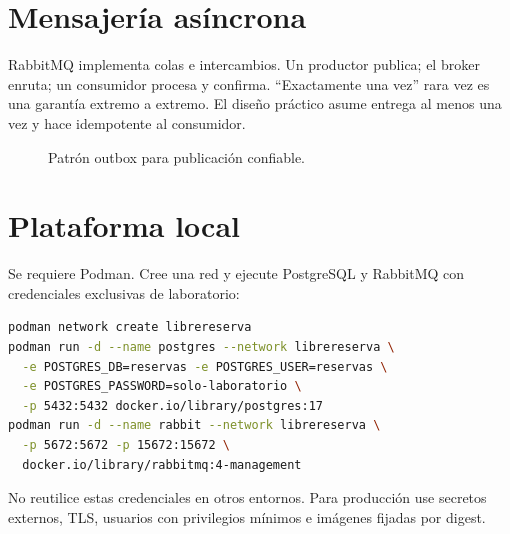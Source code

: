 \section{Mensajería asíncrona}
RabbitMQ implementa colas e intercambios. Un productor publica; el broker enruta; un consumidor procesa y confirma. ``Exactamente una vez'' rara vez es una garantía extremo a extremo. El diseño práctico asume entrega al menos una vez y hace idempotente al consumidor.

\begin{figure}[H]
\centering
{}
\caption{Patrón outbox para publicación confiable.}
\label{fig:outbox}
\end{figure}

\section{Plataforma local}
\begin{instalacion}
Se requiere Podman. Cree una red y ejecute PostgreSQL y RabbitMQ con credenciales exclusivas de laboratorio:
\begin{lstlisting}[language=bash]
podman network create librereserva
podman run -d --name postgres --network librereserva \
  -e POSTGRES_DB=reservas -e POSTGRES_USER=reservas \
  -e POSTGRES_PASSWORD=solo-laboratorio \
  -p 5432:5432 docker.io/library/postgres:17
podman run -d --name rabbit --network librereserva \
  -p 5672:5672 -p 15672:15672 \
  docker.io/library/rabbitmq:4-management
\end{lstlisting}
No reutilice estas credenciales en otros entornos. Para producción use secretos externos, TLS, usuarios con privilegios mínimos e imágenes fijadas por digest.
\end{instalacion}

